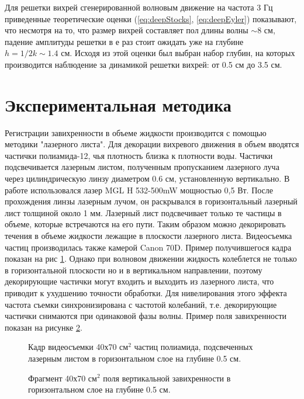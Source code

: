 Для решетки вихрей сгенерированной волновым движение на частота 3 Гц приведенные теоретические оценки (\ref{eq:deepStocks}, \ref{eq:deepEyler}) показывают, что несмотря на то, что размер вихрей составляет пол длины волны $\sim 8$ см, падение амплитуды решетки в $е$ раз стоит ожидать уже на глубине $h = 1/2k \sim 1.4$ см. Исходя из этой оценки был выбран набор глубин, на которых производится наблюдение за динамикой решетки вихрей: от 0.5 см до 3.5 см.


\section{Экспериментальная методика} \label{sect6_2}
Регистрации завихренности в объеме жидкости производится с помощью методики "лазерного листа". Для декорации вихревого движения в объем вводятся частички полиамида-12, чья плотность близка к плотности воды. Частички подсвечивается лазерным листом, полученным пропусканием лазерного луча через цилиндрическую линзу диаметром 0.6 см, установленную вертикально. В работе использовался лазер MGL H 532-500mW мощностью 0,5 Вт. После прохождения линзы лазерным лучом, он раскрывался в горизонтальный лазерный лист толщиной около 1 мм. Лазерный лист подсвечивает только те частицы в объеме, которые встречаются на его пути. Таким образом можно декорировать течения в объеме жидкости лежащие в плоскости лазерного листа. Видеосъемка частиц производилась также камерой Canon 70D. Пример получившегося кадра показан на рис \ref{img:track0p5cm}. Однако при волновом движении жидкость колеблется не только в горизонтальной плоскости но и в вертикальном направлении, поэтому декорирующие частички могут входить и выходить из лазерного листа, что приводит к ухудшению точности обработки. Для нивелирования этого эффекта частота съемки синхронизирована с частотой колебаний, т.е. декорирующие частички снимаются при одинаковой фазы волны. Пример поля завихренности показан на рисунке \ref{img:vort0p5cm}.
\begin{figure}[ht]
  \caption{Кадр видеосъемки 40х70 см$^2$ частиц полиамида, подсвеченных лазерным листом в горизонтальном слое на глубине 0.5 см.}
  \label{img:track0p5cm}  
\end{figure}

\begin{figure}[ht]
  \caption{Фрагмент 40х70 см$^2$ поля вертикальной завихренности в горизонтальном слое на глубине 0.5 см.}
  \label{img:vort0p5cm}  
\end{figure}


